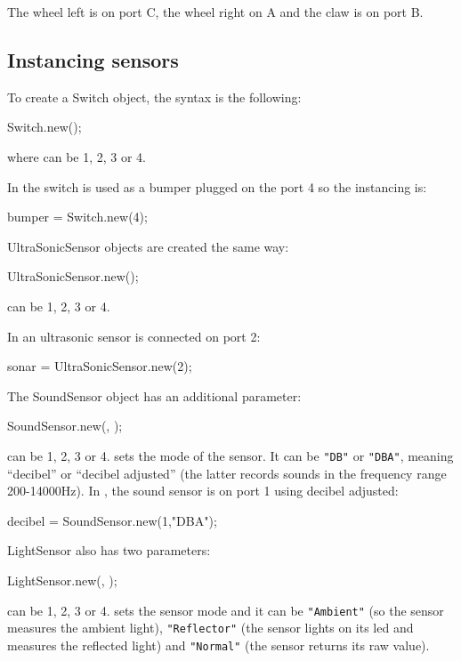 The wheel left is on port C, the wheel right on A and the claw is on port B.

\subsection{Instancing sensors}
To create a Switch object, the syntax is the following:
\begin{urbiunchecked}
Switch.new();
\end{urbiunchecked}
\noindent
where  can be 1, 2, 3 or 4.

In  the switch is used as a bumper plugged on the port 4 so
the instancing is:
\begin{urbiunchecked}
bumper  = Switch.new(4);
\end{urbiunchecked}

UltraSonicSensor objects are created the same way:
\begin{urbiunchecked}
UltraSonicSensor.new();
\end{urbiunchecked}

 can be 1, 2, 3 or 4.

In  an ultrasonic sensor is connected on port 2:
\begin{urbiunchecked}
sonar = UltraSonicSensor.new(2);
\end{urbiunchecked}

The SoundSensor object has an additional parameter:
\begin{urbiunchecked}
SoundSensor.new(, );
\end{urbiunchecked}

 can be 1, 2, 3 or 4.   sets the mode of the sensor. It
can be \lstinline{"DB"} or \lstinline{"DBA"}, meaning ``decibel'' or
``decibel adjusted'' (the latter records sounds in the frequency range
200-14000Hz).  In , the sound sensor is on port 1 using
decibel adjusted:
\begin{urbiunchecked}
decibel = SoundSensor.new(1,"DBA");
\end{urbiunchecked}

LightSensor also has two parameters:
\begin{urbiunchecked}
LightSensor.new(, );
\end{urbiunchecked}

 can be 1, 2, 3 or 4.  sets the sensor mode and it can
be \lstinline{"Ambient"} (so the sensor measures the ambient light),
\lstinline{"Reflector"} (the sensor lights on its led and measures the
reflected light) and \lstinline{"Normal"} (the sensor returns its raw
value).

